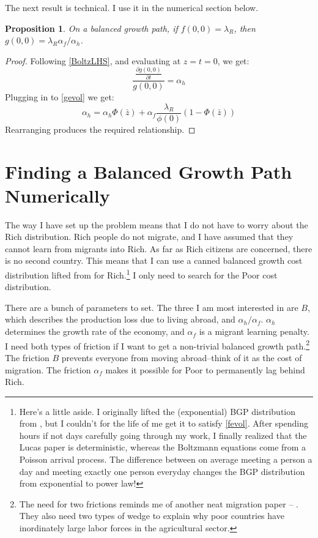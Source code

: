 \documentclass[12pt]{article}
\newtheorem{proposition}[theorem]{Proposition}
\begin{document}
    The next result is technical.  I use it in the numerical section below.
\begin{proposition}
  On a balanced growth path, if $f(0,0) = \lambda_R$, then $g(0,0) = \lambda_R\alpha_f/\alpha_h$.
\end{proposition}
\begin{proof}
    Following \eqref{BoltzLHS}, and evaluating at $z=t=0$, we get:
    \[
        \frac{\frac{\partial g(0,0)}{\partial {t}}}{g(0,0)}  = \alpha_h
    \]
    Plugging in to \eqref{gevol} we get:
    \[
        \alpha_h = \alpha_h \Phi(\bar{z}) + \alpha_f \frac{\lambda_R}{\phi(0)}(1-\Phi(\bar{z}))
    \]
    Rearranging produces the required relationship.
\end{proof}

\section{Finding a Balanced Growth Path Numerically}

The way I have set up the problem means that I do not have to worry about the Rich distribution.  Rich people do not migrate, and I have assumed that they cannot learn from migrants into Rich.  As far as Rich citizens are concerned, there is no second country.  This means that I can use a canned balanced growth cost distribution lifted from \citet{Alvarezetal2007} for Rich.\footnote{Here's a little aside.  I originally lifted the (exponential) BGP distribution from \citet{Lucas2009}, but I couldn't for the life of me get it to satisfy \eqref{fevol}.  After spending hours if not days carefully going through my work, I finally realized that the Lucas paper is deterministic, whereas the Boltzmann equations come from a Poisson arrival process.  The difference between on average meeting a person a day and meeting exactly one person everyday changes the BGP distribution from exponential to power law!} I only need to search for the Poor cost distribution.

There are a bunch of parameters to set.  The three I am most interested in are $B$, which describes the production loss due to living abroad, and $\alpha_h/\alpha_f$.  $\alpha_h$ determines the growth rate of the economy, and $\alpha_f$ is a migrant learning penalty.  I need both types of friction if I want to get a non-trivial balanced growth path.\footnote{The need for two frictions reminds me of another neat migration paper -- \citet{Restucciaetal2008}.  They also need two types of wedge to explain why poor countries have inordinately large labor forces in the agricultural sector.}  The friction $B$ prevents everyone from moving abroad--think of it as the cost of migration.  The friction $\alpha_f$ makes it possible for Poor to permanently lag behind Rich.
\end{document}
